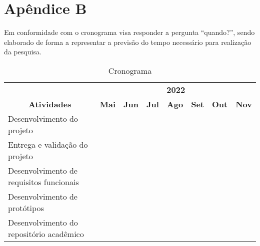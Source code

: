 \chapter*{Apêndice B}

Em conformidade com \citep[p. 128]{LAKATOS2021:metodologia} o cronograma
visa responder a pergunta “quando?”, sendo elaborado de forma a
representar a previsão do tempo necessário para realização da pesquisa.

\begin{table}[H]
    \caption{Cronograma}
    \label{quad:cronograma}
    \begin{tabular}{|p{7cm}|l|l|l|l|l|l|l|}
        \hline
        \multicolumn{1}{|c|}{}                                      & \multicolumn{7}{c|}{\textbf{2022}}                                                                                                                                                                   \\ \cline{2-8}
        \multicolumn{1}{|c|}{\multirow{-2}{*}{\textbf{Atividades}}} & \textbf{Mai}                       & \textbf{Jun}             & \textbf{Jul}             & \textbf{Ago}             & \textbf{Set}             & \textbf{Out}             & \textbf{Nov}             \\ \hline
        Desenvolvimento do projeto                                  & \cellcolor[HTML]{000000}           & \cellcolor[HTML]{000000} &                          &                          &                          &                          &                          \\ \hline
        Entrega e validação do projeto                              &                                    & \cellcolor[HTML]{000000} &                          &                          &                          &                          &                          \\ \hline
        Desenvolvimento de requisitos funcionais                    &                                    & \cellcolor[HTML]{000000} &                          &                          &                          &                          &                          \\ \hline
        Desenvolvimento de protótipos                               &                                    & \cellcolor[HTML]{000000} & \cellcolor[HTML]{000000} &                          &                          &                          &                          \\ \hline
        Desenvolvimento do repositório acadêmico                    &                                    &                          & \cellcolor[HTML]{000000} & \cellcolor[HTML]{000000} & \cellcolor[HTML]{000000} & \cellcolor[HTML]{000000} &                          \\ \hline

\end{tabular}
\end{table}
